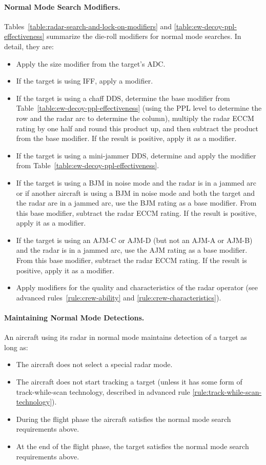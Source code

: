 {\paragraph{Normal Mode Search Modifiers.} Tables~\ref{table:radar-search-and-lock-on-modifiers} and \ref{table:ew-decoy-ppl-effectiveness} summarize the die-roll modifiers for normal mode searches. In detail, they are:
\begin{itemize}
    \item Apply the size modifier from the target’s ADC.
    \item If the target is using IFF, apply a  modifier.
    \item If the target is using a chaff DDS, determine the base modifier from Table~\ref{table:ew-decoy-ppl-effectiveness} (using the PPL level to determine the row and the radar arc to determine the column), multiply the radar ECCM rating by one half and round this product up, and then subtract the product from the base modifier. If the result is positive, apply it as a modifier.
    \item If the target is using a mini-jammer DDS, determine and apply the modifier from Table~\ref{table:ew-decoy-ppl-effectiveness}.
    \item If the target is using a BJM in noise mode and the radar is in a jammed arc or if another aircraft is using a BJM in noise mode and both the target and the radar are in a jammed arc, use the BJM rating as a base modifier. From this base modifier, subtract the radar ECCM rating. If the result is positive, apply it as a modifier.
    \item If the target is using an AJM-C or AJM-D (but not an AJM-A or AJM-B) and the radar is in a jammed arc, use the AJM rating as a base modifier. From this base modifier, subtract the radar ECCM rating. If the result is positive, apply it as a modifier.
    \item Apply modifiers for the quality and characteristics of the radar operator (see advanced rules~\ref{rule:crew-ability} and \ref{rule:crew-characteristics}). 
\end{itemize}

\paragraph{Maintaining Normal Mode Detections.} An aircraft using its radar in normal mode maintains detection of a target as long as:
\begin{itemize}
\item The aircraft does not select a special radar mode.
\item The aircraft does not start tracking a target (unless it has some form of track-while-scan technology, described in advanced rule \ref{rule:track-while-scan-technology}).
\item During the flight phase the aircraft satisfies the normal mode search requirements above.
\item At the end of the flight phase, the target satisfies the normal mode search requirements above.
\end{itemize}

}
